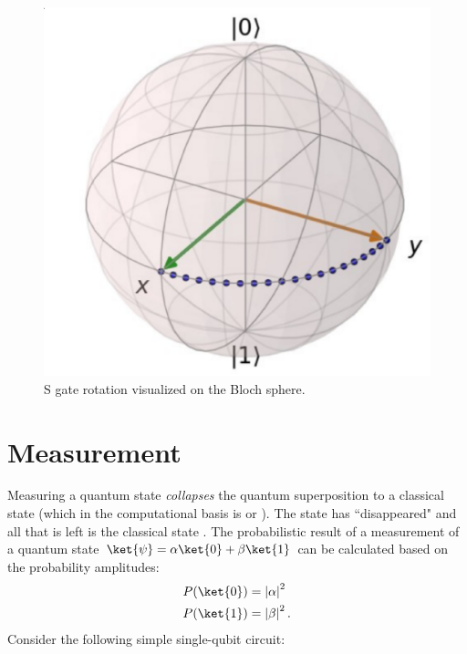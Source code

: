 \begin{figure}[ht]
  \centering
  \includegraphics[scale=0.21]{images/s_gate.eps}
  \vspace{1mm}
  \caption{S gate rotation visualized on the Bloch sphere.}
  \label{fig:s_bloch}
\end{figure}

\section{Measurement}
Measuring a quantum state \ket{\psi} \emph{collapses} the quantum superposition to a classical state  (which in the computational basis is  or ). The state \ket{\psi} has ``disappeared" and all that is left is the classical state . The probabilistic result of a measurement of a quantum state $\ket{\psi} = \alpha\ket{0} + \beta\ket{1}$ can be calculated based on the probability amplitudes:
\begin{align}
  P(\ket{0}) &= \left|\alpha\right|^2 \\
  P(\ket{1}) &= \left|\beta\right|^2.
\end{align}
Consider the following simple single-qubit circuit:

